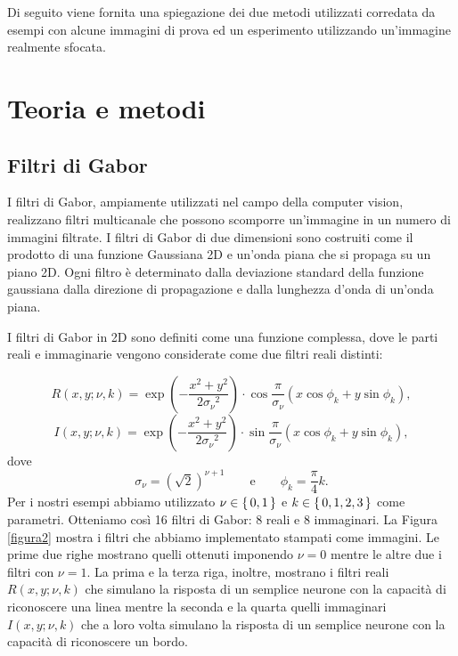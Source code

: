 \documentclass[final]{siamltex}
\begin{document}
Di seguito viene fornita una spiegazione dei due metodi utilizzati corredata da esempi con alcune immagini di prova ed un esperimento utilizzando un'immagine realmente sfocata.
%
%
%
\section{Teoria e metodi}\label{sec2} 
%
\subsection{Filtri di Gabor}\label{sec5}
%
I filtri di Gabor, ampiamente utilizzati nel campo della computer vision, realizzano filtri multicanale che possono scomporre un'immagine in un numero di immagini filtrate. I filtri di Gabor di due dimensioni sono costruiti come il prodotto di una funzione Gaussiana 2D e un'onda piana che si propaga su un piano 2D. Ogni filtro \`{e} determinato dalla deviazione standard della funzione gaussiana dalla direzione di propagazione e dalla lunghezza d'onda di un'onda piana. 

I filtri di Gabor in 2D sono definiti come una funzione complessa, dove le parti reali e immaginarie vengono considerate come due filtri reali distinti:

\begin{equation}
\label{eq:gabor1}
R(x,y;\nu,k) = \exp\left(-\frac{x^2+y^2}{2{\sigma_\nu}^2}\right)\cdot \cos\frac{\pi}{\sigma_\nu}\left(x\cos\phi_k+y\sin\phi_k\right),
\end{equation} 
%
\begin{equation}
\label{eq:gabor2}
I(x,y;\nu,k) = \exp\left(-\frac{x^2+y^2}{2{\sigma_\nu}^2}\right)\cdot \sin\frac{\pi}{\sigma_\nu}\left(x\cos\phi_k+y\sin\phi_k\right),
\end{equation} 
%
dove
%
\begin{equation}
\sigma_\nu = \left(\sqrt{2}\right)^{\nu+1} \qquad \mbox{e} \qquad \phi_k = \frac{\pi}{4}k.
\end{equation}
%
Per i nostri esempi abbiamo utilizzato $\nu \in \set{0,1}$ e 
$k \in \set{0,1,2,3}$ come parametri. Otteniamo così 16 filtri di Gabor: 8 reali e 8 immaginari. La Figura \ref{figura2} mostra i filtri che abbiamo implementato stampati come immagini. Le prime due righe mostrano quelli ottenuti imponendo $\nu =0$ mentre le altre due i filtri con $\nu =1$. La prima e la terza riga, inoltre, mostrano i filtri reali $R(x,y;\nu,k)$ che simulano la risposta di un semplice neurone con la capacità di riconoscere una linea mentre la seconda e la quarta quelli immaginari $I(x,y;\nu,k)$ che a loro volta simulano la risposta di un semplice neurone con la capacità di riconoscere un bordo. 
\end{document}
